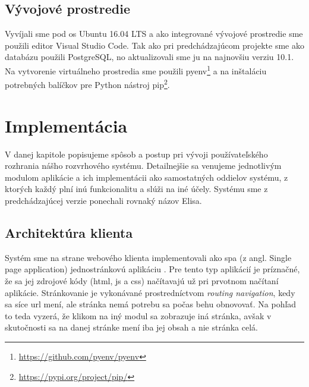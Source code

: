 \subsection{Vývojové prostredie}
\label{subsec:develop_env}

Vyvíjali sme pod \acrshort{os} Ubuntu 16.04 LTS a ako integrované vývojové prostredie
sme použili editor Visual Studio Code. Tak ako pri predchádzajúcom projekte sme ako databázu
použili PostgreSQL, no aktualizovali sme ju na najnovšiu verziu 10.1.
Na vytvorenie virtuálneho prostredia sme použili pyenv\footnote{\url{https://github.com/pyenv/pyenv}}
a na inštaláciu potrebných balíčkov pre Python nástroj pip\footnote{\url{https://pypi.org/project/pip/}}.
\section{Implementácia}
\label{sec:implementation}

V danej kapitole popisujeme spôsob a postup pri vývoji používateľského rozhrania nášho rozvrhového
systému. Detailnejšie sa venujeme jednotlivým modulom aplikácie a ich implementácii ako samostatných
oddielov systému, z ktorých každý plní inú funkcionalitu a slúži na iné účely. Systému sme z predchádzajúcej
verzie ponechali rovnaký názov Elisa.

\subsection{Architektúra klienta}
\label{subsec:client_architecture}

Systém sme na strane webového klienta implementovali ako \acrshort{spa} (z angl. Single page application)
jednostránkovú aplikáciu . Pre tento typ aplikácií je príznačné, že sa jej zdrojové
kódy (\acrshort{html}, \acrshort{js} a \acrshort{css}) načítavajú už pri prvotnom
načítaní aplikácie. Stránkovanie je vykonávané prostredníctvom \textit{routing navigation},
kedy sa síce \acrshort{url} mení, ale stránka nemá potrebu sa počas behu obnovovať.
Na pohľad to teda vyzerá, že klikom na iný modul sa zobrazuje iná stránka, avšak v skutočnosti
sa na danej stránke mení iba jej obsah a nie stránka celá. 


